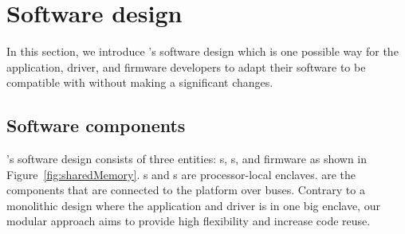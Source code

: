 \section{\name Software design}
\label{sec:programmingModel}


In this section, we introduce \name{}'s software design which is one possible way for the application, driver, and firmware developers to adapt their software to be compatible with \name without making a significant changes.  


\subsection{Software components}
\label{sec:programmingModel:systemComponents}

\name's software design consists of three entities: \app{}s, \ce{}s, and \sphw firmware as shown in Figure~\ref{fig:sharedMemory}. \app{}s and \ce{}s are processor-local enclaves. \sphw are the components that are connected to the platform over buses. Contrary to a monolithic design where the application and driver is in one big enclave, our modular approach aims to provide high flexibility and increase code reuse.


